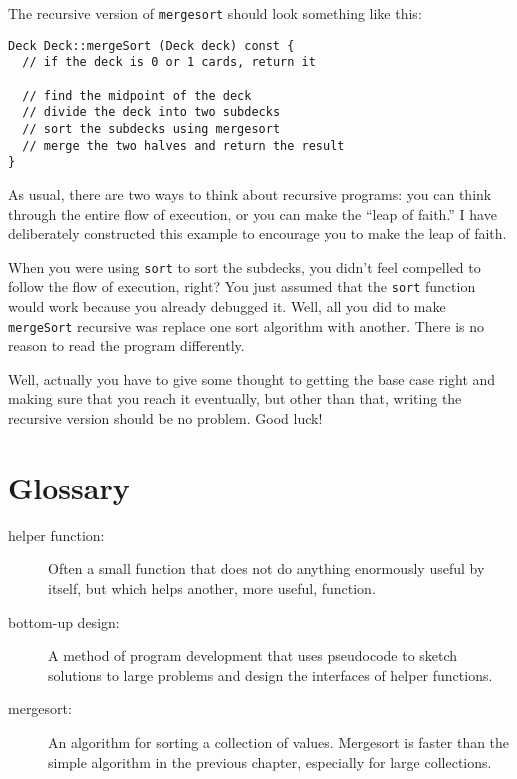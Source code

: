 The recursive version of {\tt mergesort} should look something
like this:

\begin{verbatim}
Deck Deck::mergeSort (Deck deck) const {
  // if the deck is 0 or 1 cards, return it

  // find the midpoint of the deck
  // divide the deck into two subdecks
  // sort the subdecks using mergesort
  // merge the two halves and return the result
}
\end{verbatim}
%
As usual, there are two ways to think about recursive programs:
you can think through the entire flow of execution, or you
can make the ``leap of faith.''  I have deliberately constructed
this example to encourage you to make the leap of faith.


When you were using {\tt sort} to sort the subdecks, you didn't
feel compelled to follow the flow of execution, right?  You just
assumed that the {\tt sort} function would work because you already
debugged it.  Well, all you did to make {\tt mergeSort} recursive was
replace one sort algorithm with another.  There is no reason to read
the program differently.

Well, actually you have to give some thought to getting the
base case right and making sure that you reach it eventually,
but other than that, writing the recursive version should be
no problem.  Good luck!

\section{Glossary}

\begin{description}

\item[helper function:]  Often a small function that does not
do anything enormously useful by itself, but which helps
another, more useful, function.

\item[bottom-up design:]  A method of program development that
uses pseudocode to sketch solutions to large problems and
design the interfaces of helper functions.

\item[mergesort:]  An algorithm for sorting a collection of
values.  Mergesort is faster than the simple algorithm in
the previous chapter, especially for large collections.



\end{description}

